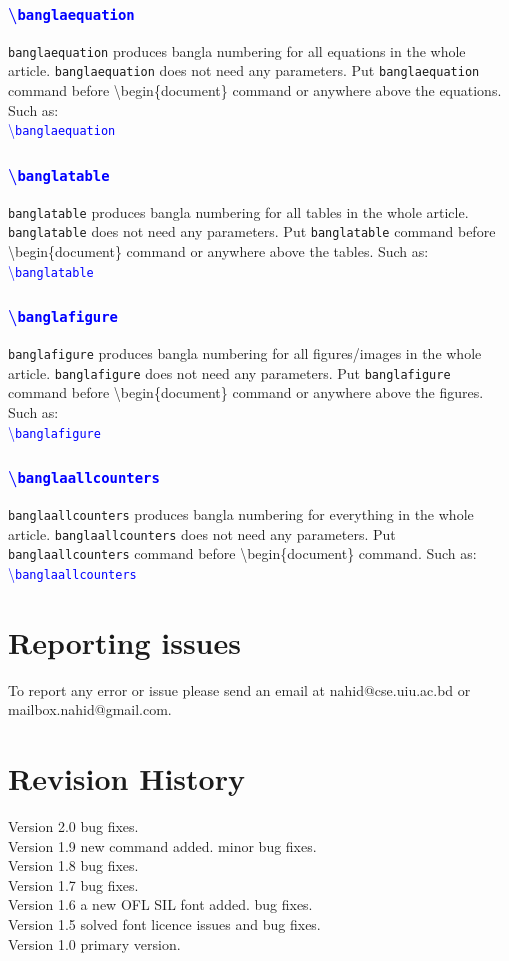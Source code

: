 \documentclass{article}
\newcommand{\com}[2]{\textcolor{blue}{\textbackslash\texttt{#1}}\texttt{#2}}
\begin{document}
\subsubsection{\com{banglaequation}{}}
\texttt{banglaequation} produces bangla numbering for all equations in the whole article. \texttt{banglaequation} does not need any parameters. 
Put \texttt{banglaequation} command before \textbackslash begin\{document\} command or anywhere above the equations. Such as:\\
\com{banglaequation}{}

\subsubsection{\com{banglatable}{}}
\texttt{banglatable} produces bangla numbering for all tables in the whole article. \texttt{banglatable} does not need any parameters. 
Put \texttt{banglatable} command before \textbackslash begin\{document\} command or anywhere above the tables. Such as:\\
\com{banglatable}{}


\subsubsection{\com{banglafigure}{}}
\texttt{banglafigure} produces bangla numbering for all figures/images in the whole article. \texttt{banglafigure} does not need any parameters. 
Put \texttt{banglafigure} command before \textbackslash begin\{document\} command or anywhere above the figures. Such as:\\
\com{banglafigure}{}


\subsubsection{\com{banglaallcounters}{}}
\texttt{banglaallcounters} produces bangla numbering for everything in the whole article. \texttt{banglaallcounters} does not need any parameters. 
Put \texttt{banglaallcounters} command before \textbackslash begin\{document\} command. Such as:\\
\com{banglaallcounters}{}

\section{Reporting issues}
To report any error or issue please send an email at nahid@cse.uiu.ac.bd or mailbox.nahid@gmail.com. 
\section{Revision History}
Version 2.0 bug fixes.\\
Version 1.9 new command added. minor bug fixes.\\
Version 1.8 bug fixes.\\
Version 1.7 bug fixes.\\  
Version 1.6 a new OFL SIL font added. bug fixes.\\  
Version 1.5 solved font licence issues and bug fixes.\\ 
Version 1.0 primary version.\\
\end{document}
